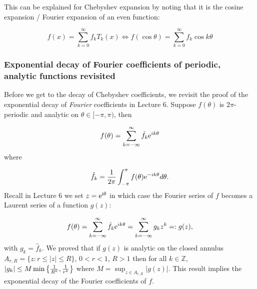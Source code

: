 \documentclass[12pt,landscape]{article}
\def\I{ {\rm i} }
\def\E{ {\rm e} }
\begin{document}
{This can be explained for Chebyshev expansion by noting that it is the cosine expansion / Fourier expansion of an even function:

\[
f(x) = \sum_{k=0}^\infty f_k T_k(x) \Leftrightarrow f(\cos \theta) = \sum_{k=0}^\infty f_k \cos k \theta
\]
\subsubsection{Exponential decay of Fourier coefficients of periodic, analytic functions revisited}
Before we get to the decay of Chebyshev coefficients, we revisit the proof of the exponential decay of \emph{Fourier} coefficients in Lecture 6. Suppose $f(\theta)$ is $2\pi$-periodic and analytic on $\theta \in [-\pi, \pi)$, then

\[
    f(\theta) = \sum_{k=-\infty}^\infty \hat f_k \E^{i k \theta}
\]
where

\[
\hat f_k = {1\over 2 \pi} \int_{-\pi}^\pi f(\theta) \E^{-i k \theta} d \theta.
\]
Recall in Lecture 6 we set $z = \E^{\I \theta}$ in which case the Fourier series of $f$ becomes a Laurent series of a function $g(z)$:

\[
f(\theta) = \sum_{k=-\infty}^\infty \hat f_k \E^{i k \theta} = \sum_{k=-\infty}^\infty g_k z^k =: g(z),
\]
with $g_k = \hat f_k$. We proved that if $g(z)$ is analytic on the closed annulus $A_{r,R} = \lbrace z : r \leq \vert z \vert \leq R \rbrace$, $0 < r <1$, $R > 1$ then for all $k \in \mathbb{Z}$, $|g_k | \leq M\min\left\{{1 \over R^k} , {1 \over r^k}\right\}$ where $M = \sup_{z \in  A_{r,R}} |g(z)|$. This result implies the exponential decay of the Fourier coefficients of $f$.

}
\end{document}
